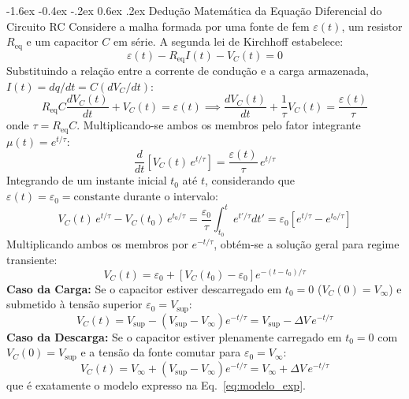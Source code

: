 \documentclass[12pt, a4paper]{article}
\makeatletter
\renewcommand\section{\@startsection {section}{1}{\z@}%
                                   {-1.6ex \@plus -0.4ex \@minus -.2ex}%
                                   {0.6ex \@plus .2ex}%
                                   {\normalfont\large\bfseries}}
\makeatother
\begin{document}
\section{Dedução Matemática da Equação Diferencial do Circuito RC}\label{ap:deducao}
Considere a malha formada por uma fonte de fem $\varepsilon(t)$, um resistor $R_{\text{eq}}$ e um capacitor $C$ em série. A segunda lei de Kirchhoff estabelece:
\begin{equation}
    \varepsilon(t) - R_{\text{eq}} I(t) - V_C(t) = 0 \label{eq:ap_kirch}
\end{equation}
Substituindo a relação entre a corrente de condução e a carga armazenada, $I(t) = dq/dt = C (dV_C/dt)$:
\begin{equation}
    R_{\text{eq}} C \frac{dV_C(t)}{dt} + V_C(t) = \varepsilon(t) \implies \frac{dV_C(t)}{dt} + \frac{1}{\tau} V_C(t) = \frac{\varepsilon(t)}{\tau}
\end{equation}
onde $\tau = R_{\text{eq}} C$. Multiplicando-se ambos os membros pelo fator integrante $\mu(t) = e^{t/\tau}$:
\begin{equation}
    \frac{d}{dt}\left[ V_C(t) \, e^{t/\tau} \right] = \frac{\varepsilon(t)}{\tau} \, e^{t/\tau}
\end{equation}
Integrando de um instante inicial $t_0$ até $t$, considerando que $\varepsilon(t) = \varepsilon_0 = \text{constante}$ durante o intervalo:
\begin{equation}
    V_C(t) \, e^{t/\tau} - V_C(t_0) \, e^{t_0/\tau} = \frac{\varepsilon_0}{\tau} \int_{t_0}^t e^{t'/\tau} dt' = \varepsilon_0 \left[ e^{t/\tau} - e^{t_0/\tau} \right]
\end{equation}
Multiplicando ambos os membros por $e^{-t/\tau}$, obtém-se a solução geral para regime transiente:
\begin{equation}
    V_C(t) = \varepsilon_0 + \left[ V_C(t_0) - \varepsilon_0 \right] e^{-(t - t_0)/\tau}
\end{equation}
\noindent\textbf{Caso da Carga:} Se o capacitor estiver descarregado em $t_0 = 0$ ($V_C(0) = V_{\infty}$) e submetido à tensão superior $\varepsilon_0 = V_{\text{sup}}$:
\begin{equation}
    V_C(t) = V_{\text{sup}} - (V_{\text{sup}} - V_{\infty}) e^{-t/\tau} = V_{\text{sup}} - \Delta V \, e^{-t/\tau}
\end{equation}
\noindent\textbf{Caso da Descarga:} Se o capacitor estiver plenamente carregado em $t_0 = 0$ com $V_C(0) = V_{\text{sup}}$ e a tensão da fonte comutar para $\varepsilon_0 = V_{\infty}$:
\begin{equation}
    V_C(t) = V_{\infty} + (V_{\text{sup}} - V_{\infty}) e^{-t/\tau} = V_{\infty} + \Delta V \, e^{-t/\tau}
\end{equation}
que é exatamente o modelo expresso na Eq.~\eqref{eq:modelo_exp}.
\end{document}
